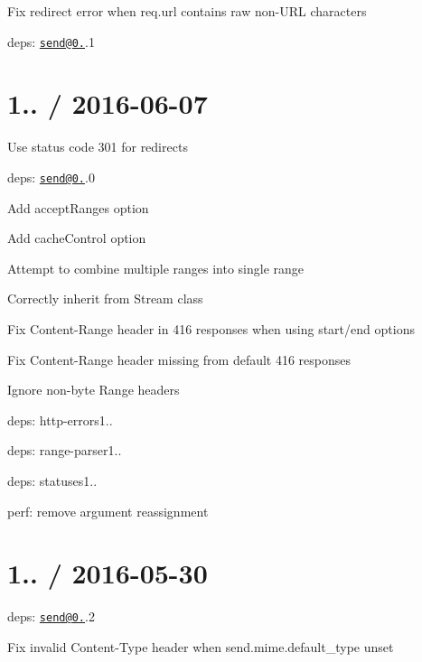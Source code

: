 \begin{DoxyItemize}
\item Fix redirect error when {\ttfamily req.\+url} contains raw non-\/\+U\+RL characters
\item deps\+: \href{mailto:send@0.14}{\tt send@0.}.1
\end{DoxyItemize}

\section*{1.. / 2016-\/06-\/07 }


\begin{DoxyItemize}
\item Use status code 301 for redirects
\item deps\+: \href{mailto:send@0.14}{\tt send@0.}.0
\begin{DoxyItemize}
\item Add {\ttfamily accept\+Ranges} option
\item Add {\ttfamily cache\+Control} option
\item Attempt to combine multiple ranges into single range
\item Correctly inherit from {\ttfamily Stream} class
\item Fix {\ttfamily Content-\/\+Range} header in 416 responses when using {\ttfamily start}/{\ttfamily end} options
\item Fix {\ttfamily Content-\/\+Range} header missing from default 416 responses
\item Ignore non-\/byte {\ttfamily Range} headers
\item deps\+: http-\/errors1..
\item deps\+: range-\/parser1..
\item deps\+: statuses1..
\item perf\+: remove argument reassignment
\end{DoxyItemize}
\end{DoxyItemize}

\section*{1.. / 2016-\/05-\/30 }


\begin{DoxyItemize}
\item deps\+: \href{mailto:send@0.13}{\tt send@0.}.2
\begin{DoxyItemize}
\item Fix invalid {\ttfamily Content-\/\+Type} header when {\ttfamily send.\+mime.\+default\+\_\+type} unset
\end{DoxyItemize}
\end{DoxyItemize}

